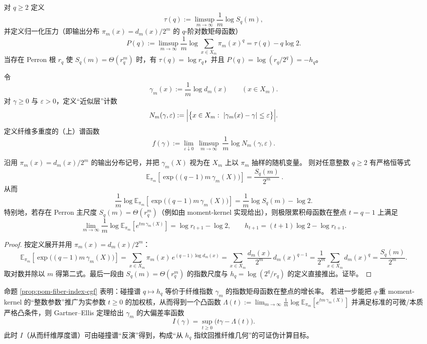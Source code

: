 \begin{definition}\label{def:pom-moment-pressure}
对 \(q\ge 2\) 定义
$$
\tau(q):=\limsup_{m\to\infty}\frac{1}{m}\log S_q(m),
$$
并定义归一化压力（即输出分布 \(\pi_m(x)=d_m(x)/2^m\) 的 \(q\)-阶对数矩母函数）
$$
P(q):=\limsup_{m\to\infty}\frac{1}{m}\log\sum_{x\in X_m}\pi_m(x)^q
=\tau(q)-q\log 2.
$$
当存在 Perron 根 \(r_q\) 使 \(S_q(m)=\Theta(r_q^m)\) 时，有 \(\tau(q)=\log r_q\)，并且 \(P(q)=\log(r_q/2^q)=-h_q\)。
\end{definition}

\begin{definition}[纤维多重度的对数谱函数]\label{def:pom-fiber-spectrum}
令
$$
\gamma_m(x):=\frac{1}{m}\log d_m(x)\qquad(x\in X_m).
$$
对 \(\gamma\ge 0\) 与 \(\varepsilon>0\)，定义“近似层”计数
$$
N_m(\gamma,\varepsilon):=\Bigl|\bigl\{x\in X_m:\ |\gamma_m(x)-\gamma|\le \varepsilon\bigr\}\Bigr|.
$$
定义纤维多重度的（上）谱函数
$$
f(\gamma):=\lim_{\varepsilon\downarrow 0}\ \limsup_{m\to\infty}\ \frac{1}{m}\log N_m(\gamma,\varepsilon).
$$
\end{definition}

\begin{proposition}\label{prop:pom-fiber-index-cgf}
沿用 \(\pi_m(x)=d_m(x)/2^m\) 的输出分布记号，并把 \(\gamma_m(X)\) 视为在 \(X_m\) 上以 \(\pi_m\) 抽样的随机变量。
则对任意整数 \(q\ge 2\) 有严格恒等式
\[
\boxed{\;
\mathbb{E}_{\pi_m}\!\left[\exp\!\bigl((q-1)m\,\gamma_m(X)\bigr)\right]
=\frac{S_q(m)}{2^m}\; }.
\]
从而
\[
\frac{1}{m}\log \mathbb{E}_{\pi_m}\!\left[\exp\!\bigl((q-1)m\,\gamma_m(X)\bigr)\right]
=\frac{1}{m}\log S_q(m)-\log 2.
\]
特别地，若存在 Perron 主尺度 \(S_q(m)=\Theta(r_q^m)\)（例如由 moment-kernel 实现给出），则极限累积母函数在整点 \(t=q-1\) 上满足
\[
\lim_{m\to\infty}\frac{1}{m}\log \mathbb{E}_{\pi_m}\!\left[e^{t m\,\gamma_m(X)}\right]
=\log r_{t+1}-\log 2,
\qquad
h_{t+1}=(t+1)\log 2-\log r_{t+1}.
\]
\end{proposition}
\begin{proof}
按定义展开并用 \(\pi_m(x)=d_m(x)/2^m\)：
\[
\mathbb{E}_{\pi_m}\!\left[\exp\!\bigl((q-1)m\,\gamma_m(X)\bigr)\right]
=\sum_{x\in X_m}\pi_m(x)\,e^{(q-1)\log d_m(x)}
=\sum_{x\in X_m}\frac{d_m(x)}{2^m}\,d_m(x)^{q-1}
=\frac{1}{2^m}\sum_{x\in X_m}d_m(x)^q
=\frac{S_q(m)}{2^m}.
\]
取对数并除以 \(m\) 得第二式。最后一段由 \(S_q(m)=\Theta(r_q^m)\) 的指数尺度与 \(h_q=\log(2^q/r_q)\) 的定义直接推出。证毕。
\end{proof}

\begin{remark}\label{rem:pom-fiber-index-ldp}
命题 \ref{prop:pom-fiber-index-cgf} 表明：碰撞谱 \(q\mapsto h_q\) 等价于纤维指数 \(\gamma_m\) 的指数矩母函数在整点的增长率。
若进一步能把 \(q\)-重 moment-kernel 的“整数参数”推广为实参数 \(t\ge 0\) 的加权核，从而得到一个凸函数
\(
\Lambda(t):=\lim_{m\to\infty}\frac{1}{m}\log \mathbb{E}_{\pi_m}[e^{t m\,\gamma_m(X)}]
\)
并满足标准的可微/本质严格凸条件，则 Gartner--Ellis 定理给出 \(\gamma_m\) 的大偏差率函数
\[
I(\gamma)=\sup_{t\ge 0}\bigl(t\gamma-\Lambda(t)\bigr).
\]
此时 \(I\)（从而纤维厚度谱）可由碰撞谱“反演”得到，构成“从 \(h_q\) 指纹回推纤维几何”的可证伪计算目标。
\end{remark}

